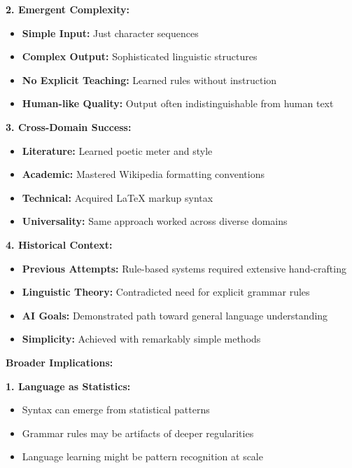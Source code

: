 \documentclass[12pt]{article}
\begin{document}
\begin{enumerate}[(a)]
{    \textbf{2. Emergent Complexity:}
    \begin{itemize}
        \item \textbf{Simple Input:} Just character sequences
        \item \textbf{Complex Output:} Sophisticated linguistic structures
        \item \textbf{No Explicit Teaching:} Learned rules without instruction
        \item \textbf{Human-like Quality:} Output often indistinguishable from human text
    \end{itemize}
    
    \textbf{3. Cross-Domain Success:}
    \begin{itemize}
        \item \textbf{Literature:} Learned poetic meter and style
        \item \textbf{Academic:} Mastered Wikipedia formatting conventions
        \item \textbf{Technical:} Acquired LaTeX markup syntax
        \item \textbf{Universality:} Same approach worked across diverse domains
    \end{itemize}
    
    \textbf{4. Historical Context:}
    \begin{itemize}
        \item \textbf{Previous Attempts:} Rule-based systems required extensive hand-crafting
        \item \textbf{Linguistic Theory:} Contradicted need for explicit grammar rules
        \item \textbf{AI Goals:} Demonstrated path toward general language understanding
        \item \textbf{Simplicity:} Achieved with remarkably simple methods
    \end{itemize}
    
    \textbf{Broader Implications:}
    
    \textbf{1. Language as Statistics:}
    \begin{itemize}
        \item Syntax can emerge from statistical patterns
        \item Grammar rules may be artifacts of deeper regularities
        \item Language learning might be pattern recognition at scale
    \end{itemize}
    
}
\end{enumerate}
\end{document}
